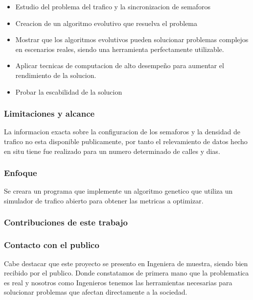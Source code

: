 \begin{itemize}
	\item Estudio del problema del trafico y la sincronizacion de semaforos
	\item Creacion de un algoritmo evolutivo que resuelva el problema
	\item Mostrar que los algoritmos evolutivos pueden solucionar problemas complejos en escenarios  reales, siendo una herramienta perfectamente utilizable.
	\item Aplicar tecnicas de computacion de alto desempeño para aumentar el rendimiento de la solucion.
	\item Probar la escabilidad de la solucion
\end{itemize}

\subsubsection{Limitaciones y alcance}
La informacion exacta sobre la configuracion de los semaforos y la densidad de trafico no esta disponible publicamente, por tanto el relevamiento de datos hecho en situ tiene fue realizado para un numero determinado de calles y dias.

 
\subsubsection{Enfoque}
Se creara un programa que implemente un algoritmo genetico  que utiliza un simulador de trafico abierto para obtener las metricas a optimizar.

\subsubsection{Contribuciones de este trabajo}



\subsubsection{Contacto con el publico}
Cabe destacar que este proyecto se presento en Ingeniera de muestra, siendo bien recibido por el publico. Donde constatamos de primera mano que la problematica es real y nosotros como Ingenieros tenemos las herramientas necesarias para solucionar problemas que afectan directamente a la sociedad.

